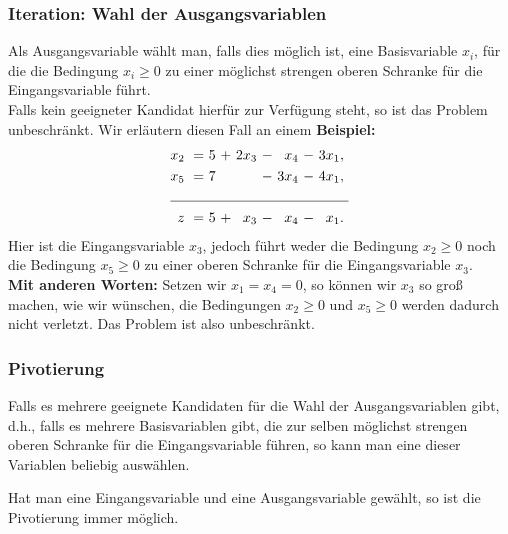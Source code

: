 \documentclass[smaller]{beamer}
\begin{document}
\begin{frame}
 \frametitle{Iteration: Wahl der Ausgangsvariablen}
 Als Ausgangsvariable wählt man, falls dies möglich ist, eine Basisvariable $x_i$, für die die Bedingung $x_i \geq 0$ zu einer möglichst strengen oberen Schranke für die Eingangsvariable führt.\\
 \vspace*{0.2cm}
\alert{Falls kein geeigneter Kandidat hierfür zur Verfügung steht, so ist das Problem unbeschränkt}. Wir er\-läu\-tern diesen Fall an einem \textbf{Beispiel:}
\begin{align*}
\begin{alignedat}{5}
x_2 &\ = &\ 5 &\ + &\ 2x_3 &\ - &\  x_4 &\ - &\ 3x_1,\ \\ 
x_5 &\ = &\ 7 &    &       &\ - &\ 3x_4 &\ - &\ 4x_1,\ \\ \cline{1-9}
z   &\ = &\ 5 &\ + &\  x_3 &\ - &\  x_4 &\ - &\  x_1.\
\end{alignedat}
\end{align*}
Hier ist die Eingangsvariable $x_3$, jedoch führt weder die Bedingung $x_2 \geq 0$ noch die Bedingung $x_5 \geq 0$ zu einer oberen Schranke für die Eingangsvariable $x_3$. \\
\vspace*{0.2cm}
\textbf{Mit anderen Worten:} Setzen wir $x_1=x_4=0$, so können wir $x_3$ so groß machen, wie wir wünschen, die Bedingungen $x_2 \geq 0$ und $x_5 \geq 0$ werden dadurch nicht verletzt. Das Problem ist also unbeschränkt.
\end{frame}

\begin{frame}
\frametitle{Pivotierung}
Falls es mehrere geeignete Kandidaten für die Wahl der Ausgangsvariablen gibt, d.h., falls es mehrere Basisvariablen gibt, die zur selben möglichst strengen oberen Schranke für die Eingangsvariable führen, so kann man eine dieser Variablen beliebig auswählen.

Hat man eine Eingangsvariable und eine Ausgangsvariable gewählt, so ist die Pivotierung immer möglich.
\end{frame}
\end{document}
